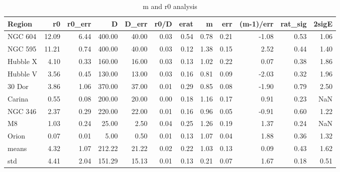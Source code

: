 \begin{table}
\centering
\caption{m and r0 analysis}
\begin{tabular}{lrrrrrrrrrrr}
\toprule
   Region &     r0 &  r0_err &       D &  D_err &  r0/D &  erat &     m &   err &  (m-1)/err &  rat_sig &  2sigE \\
\midrule
  NGC 604 &  12.09 &    6.44 &  400.00 &  40.00 &  0.03 &  0.54 &  0.78 &  0.21 &      -1.08 &     0.53 &   1.06 \\
  NGC 595 &  11.21 &    0.74 &  400.00 &  40.00 &  0.03 &  0.12 &  1.38 &  0.15 &       2.52 &     0.44 &   1.40 \\
 Hubble X &   4.10 &    0.33 &  160.00 &  16.00 &  0.03 &  0.13 &  1.02 &  0.22 &       0.07 &     0.38 &   1.86 \\
 Hubble V &   3.56 &    0.45 &  130.00 &  13.00 &  0.03 &  0.16 &  0.81 &  0.09 &      -2.03 &     0.32 &   1.96 \\
   30 Dor &   3.86 &    1.06 &  370.00 &  37.00 &  0.01 &  0.29 &  0.85 &  0.08 &      -1.90 &     0.79 &   2.50 \\
   Carina &   0.55 &    0.08 &  200.00 &  20.00 &  0.00 &  0.18 &  1.16 &  0.17 &       0.91 &     0.23 &    NaN \\
  NGC 346 &   2.37 &    0.29 &  220.00 &  22.00 &  0.01 &  0.16 &  0.96 &  0.05 &      -0.91 &     0.60 &   1.22 \\
       M8 &   1.03 &    0.24 &   25.00 &   2.50 &  0.04 &  0.25 &  1.26 &  0.19 &       1.37 &     0.24 &    NaN \\
    Orion &   0.07 &    0.01 &    5.00 &   0.50 &  0.01 &  0.13 &  1.07 &  0.04 &       1.88 &     0.36 &   1.32 \\
    means &   4.32 &    1.07 &  212.22 &  21.22 &  0.02 &  0.22 &  1.03 &  0.13 &       0.09 &     0.43 &   1.62 \\
      std &   4.41 &    2.04 &  151.29 &  15.13 &  0.01 &  0.13 &  0.21 &  0.07 &       1.67 &     0.18 &   0.51 \\
\bottomrule
\end{tabular}
\end{table}
